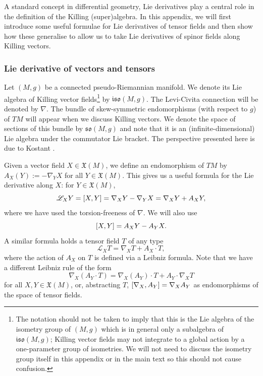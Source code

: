 \documentclass[11pt]{article}
\numberwithin{equation}{section}
\numberwithin{equation}{section}
\newcommand{\fso}{\mathfrak{so}}
\newcommand{\fiso}{\mathfrak{iso}}
\newcommand{\fX}{\mathfrak{X}}
\newcommand{\eL}{\mathscr{L}}
\newcommand{\1}{\mathbbm{1}}
\begin{document}
A standard concept in differential geometry, Lie derivatives play a central role in the definition of the Killing (super)algebra. In this appendix, we will first introduce some useful formulae for Lie derivatives of tensor fields and then show how these generalise to allow us to take Lie derivatives of spinor fields along Killing vectors.

\subsubsection{Lie derivative of vectors and tensors}
\label{sec:lei-der-vector-tensor}

Let $(M,g)$ be a connected pseudo-Riemannian manifold. We denote its Lie algebra of Killing vector fields\footnote{The notation should not be taken to imply that this is the Lie algebra of the isometry group of $(M,g)$ which is in general only a subalgebra of $\fiso(M,g)$; Killing vector fields may not integrate to a global action by a one-parameter group of isometries. We will not need to discuss the isometry group itself in this appendix or in the main text so this should not cause confusion.}
by $\fiso(M,g)$. The Levi-Civita connection will be denoted by $\nabla$. The bundle of skew-symmetric endomorphisms (with respect to $g$) of $TM$ will appear when we discuss Killing vectors. We denote the space of sections of this bundle by $\fso(M,g)$ and note that it is an (infinite-dimensional) Lie algebra under the commutator Lie bracket. The perspective presented here is due to Kostant \cite{Kostant1955}.

Given a vector field $X\in\fX(M)$, we define an endomorphism of $TM$ by
$A_X(Y) := -\nabla_Y X
$
for all $Y\in\fX(M)$. This gives us a useful formula for the Lie derivative along $X$: for $Y\in\fX(M)$,
\begin{equation}\label{eq:lie-der-vec-formula}
	\eL_X Y = \comm{X}{Y} = \nabla_X Y - \nabla_Y X = \nabla_X Y + A_X Y,
\end{equation}
where we have used the torsion-freeness of $\nabla$. We will also use
\begin{equation}\label{eq:comm-formula}
	\comm{X}{Y} = A_X Y - A_Y X.
\end{equation}
A similar formula holds a tensor field $T$ of any type
\begin{equation}\label{eq:lie-der-tensor-formula}
	\eL_X T = \nabla_X T + A_X \cdot T,
\end{equation}
where the action of $A_X$ on $T$ is defined via a Leibniz formula. Note that we have a different Leibniz rule of the form
\[
	\nabla_X (A_Y\cdot T) = \nabla_X(A_Y)\cdot T + A_Y\cdot\nabla_X T
\]
for all $X,Y\in\fX(M)$, or, abstracting $T$, $\comm{\nabla_X}{A_Y}=\nabla_X A_Y$ as endomorphisms of the space of tensor fields.
\end{document}
